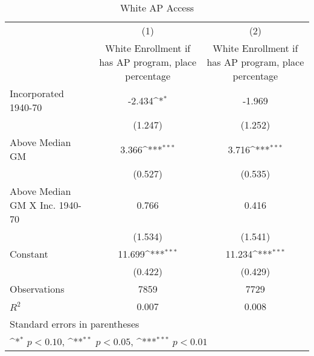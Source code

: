 \begin{table}[htbp]\centering
\def\sym#1{\ifmmode^{#1}\else\(^{#1}\)\fi}
\caption{White AP Access}
\begin{tabular}{l*{2}{c}}
\hline\hline
                    &\multicolumn{1}{c}{(1)}&\multicolumn{1}{c}{(2)}\\
                    &\multicolumn{1}{c}{White Enrollment if has AP program, place percentage}&\multicolumn{1}{c}{White Enrollment if has AP program, place percentage}\\
\hline
Incorporated 1940-70&      -2.434\sym{*}  &      -1.969         \\
                    &     (1.247)         &     (1.252)         \\
[1em]
Above Median GM     &       3.366\sym{***}&       3.716\sym{***}\\
                    &     (0.527)         &     (0.535)         \\
[1em]
Above Median GM X Inc. 1940-70&       0.766         &       0.416         \\
                    &     (1.534)         &     (1.541)         \\
[1em]
Constant            &      11.699\sym{***}&      11.234\sym{***}\\
                    &     (0.422)         &     (0.429)         \\
\hline
Observations        &        7859         &        7729         \\
\(R^{2}\)           &       0.007         &       0.008         \\
\hline\hline
\multicolumn{3}{l}{\footnotesize Standard errors in parentheses}\\
\multicolumn{3}{l}{\footnotesize \sym{*} \(p<0.10\), \sym{**} \(p<0.05\), \sym{***} \(p<0.01\)}\\
\end{tabular}
\end{table}
